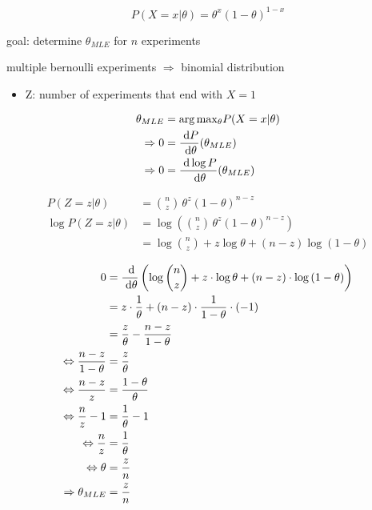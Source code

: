 \[
P(X=x|\theta) = \theta^x (1-\theta)^{1-x}
\]

goal: determine $\theta_{MLE}$ for $n$ experiments

multiple bernoulli experiments $\Rightarrow$ binomial distribution

\begin{itemize}
\item{Z: number of experiments that end with $X=1$}
\end{itemize}

\begin{align*}
\theta_{MLE} &= \mathrm{arg}\,\mathrm{max}_\theta P(X=x|\theta) \\
\Rightarrow 0 &= \frac{\;\mathrm{d} P}{\;\mathrm{d} \theta}(\theta_{MLE}) \\
\Rightarrow 0 &= \frac{\;\mathrm{d} \log{P}}{\;\mathrm{d} \theta} (\theta_{MLE})
\end{align*}

\begin{align*}
P(Z=z|\theta) &= \binom{n}{z} \, \theta^z (1-\theta)^{n-z} \\
\log P(Z=z|\theta) &= \log\left(\binom{n}{z}\,\theta^z (1-\theta)^{n-z}\right) \\
 &= \log \binom{n}{z} + z \log{\theta} + (n-z) \log{(1-\theta)}
\end{align*}

\begin{align*}
0 &= \frac{\;\mathrm{d}}{\;\mathrm{d} \theta} \left(\log \binom{n}{z} + z \cdot \log{\theta} + (n-z) \cdot \log{(1-\theta)} \right) \\
  &= z \cdot \frac{1}{\theta} + (n-z) \cdot \frac{1}{1-\theta} \cdot (-1) \\
  &= \frac{z}{\theta} - \frac{n-z}{1-\theta} \\
\Leftrightarrow \frac{n-z}{1-\theta} &= \frac{z}{\theta} \\
\Leftrightarrow \frac{n-z}{z} &= \frac{1-\theta}{\theta} \\
\Leftrightarrow \frac{n}{z} - 1 &= \frac{1}{\theta} - 1 \\
\Leftrightarrow \frac{n}{z} &= \frac{1}{\theta} \\
\Leftrightarrow \theta &= \frac{z}{n} \\
\Rightarrow \theta_{MLE} &= \frac{z}{n}
\end{align*}

